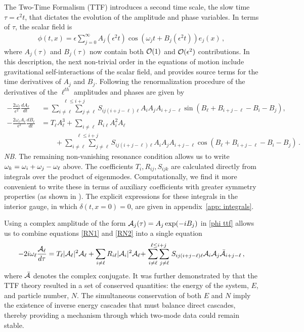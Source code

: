 \documentclass[../PhD.tex]{subfiles}
\begin{document}
The Two-Time Formalism (TTF) introduces a second time scale, the slow time $\tau = \epsilon^2 t$, that dictates the evolution of the amplitude and phase variables. In terms of $\tau$, the scalar field is
\begin{align}
\label{phi ttf}
\phi(t,x) = \epsilon \sum_{j=0}^\infty A_j (\epsilon^2 t) \cos \left(\omega_j t + B_j(\epsilon^2 t) \right) e_j(x) \, ,
\end{align}
where $A_j (\tau)$ and $B_j(\tau)$ now contain both $\mathcal O(1)$ and $\mathcal O(\epsilon^2)$ contributions. In this description, the next non-trivial order in the equations of motion include gravitational self-interactions of the scalar field, and provides source terms for the time derivatives of $A_j$ and $B_j$. Following the renormalization procedure of \cite{1407.6273} the derivatives of the $\ell^{th}$ amplitudes and phases are given by
\begin{align}
\label{RN1}
-\frac{2\omega_\ell}{\epsilon^2} \frac{d A_\ell}{d t} &= \stackrel{\ell \leq i + j}{\sum_{i \neq \ell} \sum_{j \neq \ell}} S_{ij (i + j -\ell) \ell} A_i A_j A_{i + j - \ell} \sin \left( B_\ell + B_{i+j-\ell} - B_i - B_j \right) , \\
\label{RN2}
- \frac{2 \omega_\ell A_\ell}{\epsilon^2} \frac{d B_\ell}{dt} &= T_\ell A_\ell^3 + \sum_{i \neq \ell} R_{i \ell} A^2_i A_\ell  \nonumber \\
& \qquad + \stackrel{\ell \leq i + j}{\sum_{i \neq \ell} \sum_{j \neq \ell}} S_{ij (i + j -\ell) \ell} A_i A_j A_{i + j - \ell} \cos \left( B_\ell + B_{i+j-\ell} - B_i - B_j \right) \, .
\end{align}
{\it NB.} The remaining non-vanishing resonance condition allows us to write $\omega_k = \omega_i + \omega_j - \omega_\ell$ above. The coefficients $T_i, R_{ij}, S_{ijk}$ are calculated directly from integrals over the product of eigenmodes. Computationally, we find it more convenient to write these in terms of auxiliary coefficients with greater symmetry properties (as shown in \cite{1508.04943}). The explicit expressions for these integrals in the interior gauge, in which $\delta(t,x=0)=0$, are given in appendix~\ref{app: integrals}. 

Using a complex amplitude of the form $\mathcal A_j(\tau) = A_j \exp (-i B_j )$ in \eqref{phi ttf} allows us to combine equations \eqref{RN1} and \eqref{RN2} into a single equation
\begin{align}
\label{ttf eqn}
-2i \omega_\ell \frac{\mathcal A_\ell}{d \tau} = T_\ell |\mathcal A_\ell|^2 \mathcal A_\ell + \sum_{i \neq \ell} R_{i\ell} |\mathcal A_i|^2 \mathcal A_\ell + \stackrel{\ell \leq i+j}{\sum_{i \neq \ell} \sum_{j \neq \ell}} S_{ij(i+j-\ell)\ell} \mathcal A_i \mathcal A_j \bar{\mathcal A}_{i+j-\ell} \, ,
\end{align}
where $\bar{\mathcal A}$ denotes the complex conjugate. It was further demonstrated by \cite{1412.4761} that the TTF theory resulted in a set of conserved quantities: the energy of the system, $E$, and particle number, $N$. The simultaneous conservation of both $E$ and $N$ imply the existence of inverse energy cascades that must balance direct cascades, thereby providing a mechanism through which two-mode data could remain stable.
\end{document}
